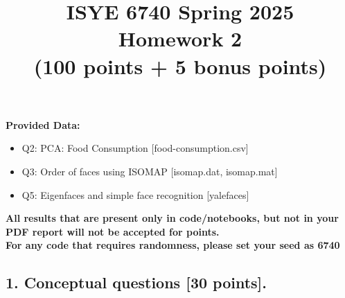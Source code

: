 \documentclass[twoside,10pt]{article}
\begin{document}
\title{ISYE 6740 Spring 2025\\ Homework 2 \\
(100 points + 5 bonus points)}
\date{}

\maketitle

\textbf{Provided Data:}
\begin{itemize}
    \item Q2: PCA: Food Consumption [food-consumption.csv]
    \item Q3: Order of faces using ISOMAP [isomap.dat, isomap.mat]
    \item Q5: Eigenfaces and simple face recognition [yalefaces]
\end{itemize}

\leavevmode\newline
\textbf{All results that are present only in code/notebooks, but not in your PDF report will not be accepted for points.}\\
\textbf{For any code that requires randomness, please set your seed as 6740}

\subsection*{1. Conceptual questions [30 points].}
\end{document}
